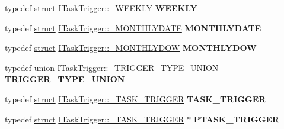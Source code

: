 \begin{DoxyCompactItemize}
\mbox{\label{interface_i_task_trigger_a2c0b44e0a2607a2f49bba97c3bc59216}} 
typedef \hyperlink{interfacestruct}{struct} \hyperlink{struct_i_task_trigger_1_1___w_e_e_k_l_y}{I\+Task\+Trigger\+::\+\_\+\+W\+E\+E\+K\+LY} {\bfseries W\+E\+E\+K\+LY}
\item 
\mbox{\label{interface_i_task_trigger_a248ab7c6de16b7188e11db2b6f29faaa}} 
typedef \hyperlink{interfacestruct}{struct} \hyperlink{struct_i_task_trigger_1_1___m_o_n_t_h_l_y_d_a_t_e}{I\+Task\+Trigger\+::\+\_\+\+M\+O\+N\+T\+H\+L\+Y\+D\+A\+TE} {\bfseries M\+O\+N\+T\+H\+L\+Y\+D\+A\+TE}
\item 
\mbox{\label{interface_i_task_trigger_aaa6397a691e50a96b188cdb479e26b86}} 
typedef \hyperlink{interfacestruct}{struct} \hyperlink{struct_i_task_trigger_1_1___m_o_n_t_h_l_y_d_o_w}{I\+Task\+Trigger\+::\+\_\+\+M\+O\+N\+T\+H\+L\+Y\+D\+OW} {\bfseries M\+O\+N\+T\+H\+L\+Y\+D\+OW}
\item 
\mbox{\label{interface_i_task_trigger_aac4a9bbda15f7c444c70c8a4d90ba263}} 
typedef union \hyperlink{union_i_task_trigger_1_1___t_r_i_g_g_e_r___t_y_p_e___u_n_i_o_n}{I\+Task\+Trigger\+::\+\_\+\+T\+R\+I\+G\+G\+E\+R\+\_\+\+T\+Y\+P\+E\+\_\+\+U\+N\+I\+ON} {\bfseries T\+R\+I\+G\+G\+E\+R\+\_\+\+T\+Y\+P\+E\+\_\+\+U\+N\+I\+ON}
\item 
\mbox{\label{interface_i_task_trigger_ae20d4b2d6a6794a2b1d292ec68da7715}} 
typedef \hyperlink{interfacestruct}{struct} \hyperlink{struct_i_task_trigger_1_1___t_a_s_k___t_r_i_g_g_e_r}{I\+Task\+Trigger\+::\+\_\+\+T\+A\+S\+K\+\_\+\+T\+R\+I\+G\+G\+ER} {\bfseries T\+A\+S\+K\+\_\+\+T\+R\+I\+G\+G\+ER}
\item 
\mbox{\label{interface_i_task_trigger_a412929d0a830c255846da3a9ca3f5d21}} 
typedef \hyperlink{interfacestruct}{struct} \hyperlink{struct_i_task_trigger_1_1___t_a_s_k___t_r_i_g_g_e_r}{I\+Task\+Trigger\+::\+\_\+\+T\+A\+S\+K\+\_\+\+T\+R\+I\+G\+G\+ER} $\ast$ {\bfseries P\+T\+A\+S\+K\+\_\+\+T\+R\+I\+G\+G\+ER}
\end{DoxyCompactItemize}
